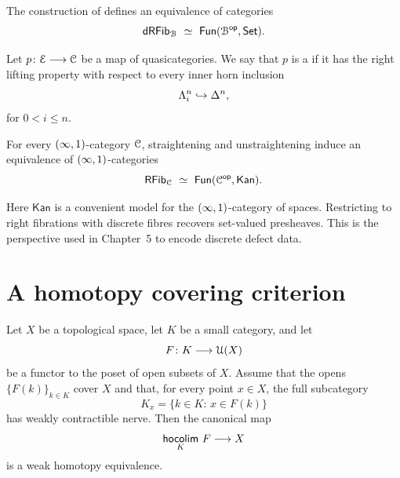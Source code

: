\begin{proposition}
    The construction of  defines an equivalence of categories
    \begin{equation}
        \mathsf{dRFib}_{\mathcal B} \,\, \simeq \,\, \operatorname{{\sf Fun}}(\mathcal B^{\mathsf{op}},\operatorname{{\mathsf{Set}}}).
    \end{equation}
\end{proposition}

\begin{definition}
    Let $p\colon \mathcal E \longrightarrow \mathcal C$ be a map of quasicategories. We say that $p$ is a  if it has the right lifting property with respect to every inner horn inclusion
    \begin{equation}
        \Lambda^{n}_{i}\hookrightarrow \Delta^{n},
    \end{equation}
    for $0<i\leq n$.
\end{definition}

\begin{theorem}\label{ap:: thm: straightening unstraightening}
    For every $(\operatorname{\infty},1)$-category $\mathcal C$, straightening and unstraightening induce an equivalence of $(\operatorname{\infty},1)$-categories
    \begin{equation}
        \mathsf{RFib}_{\mathcal C} \,\, \simeq \,\, \operatorname{\sf Fun}(\mathcal C^{\mathsf{op}},\mathsf{Kan}).
    \end{equation}
\end{theorem}

\begin{remark}
    Here $\mathsf{Kan}$ is a convenient model for the $(\operatorname{\infty},1)$-category of spaces. Restricting to right fibrations with discrete fibres recovers set-valued presheaves. This is the perspective used in Chapter~5 to encode discrete defect data.
\end{remark}

\section{A homotopy covering criterion}

\begin{theorem}\label{ap:: thm: lurie Seifert}
    Let $X$ be a topological space, let $K$ be a small category, and let
    \begin{equation}
        F\colon K \longrightarrow \mathcal{U}(X)
    \end{equation}
    be a functor to the poset of open subsets of $X$. Assume that the opens $\{F(k)\}_{k\in K}$ cover $X$ and that, for every point $x\in X$, the full subcategory
    \begin{equation}
        K_{x}=\{k\in K:\, x\in F(k)\}
    \end{equation}
    has weakly contractible nerve. Then the canonical map
    \begin{equation}
        \hoColimit[K]{F} \longra X
    \end{equation}
    is a weak homotopy equivalence.
\end{theorem}

